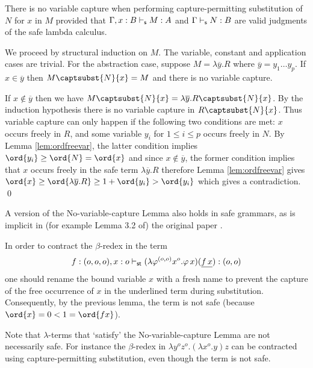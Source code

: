 \begin{lemma}\label{lem:nvc}
\label{lem:homog_nocapture} There is
no variable capture when performing capture-permitting
substitution of $N$ for $x$ in $M$
provided that $\Gamma, x:B \vdash_{\sf s} M : A$ and $\Gamma \vdash_{\sf s}  N : B$ are valid judgments of the safe lambda calculus.
\end{lemma}

\proof
  We proceed by structural induction on $M$. The variable, constant and
  application cases are trivial. For the abstraction case, suppose $M = \lambda \overline{y}. R$ where $\overline{y} = y_1
  \ldots y_p$. If $x \in \overline{y}$ then $M \captsubst{N}{x} = M$ and there is no variable capture.

 If $x \not\in \overline{y}$ then we have $M \captsubst{N}{x} = \lambda \overline{y} . R \captsubst{N}{x}$.  By the induction hypothesis there is no variable capture in $R \captsubst{N}{x}$.  Thus variable capture can only happen if the following two conditions are met: $x$ occurs freely in $R$, and some variable $y_i$ for $1 \leq i \leq p$ occurs freely in $N$. By Lemma \ref{lem:ordfreevar}, the latter condition  implies $\ord{y_i} \geq \ord{N} = \ord{x}$ and  since $x \not \in \overline{y}$, the former condition implies that $x$ occurs freely in the safe term $\lambda \overline{y}. R$
  therefore Lemma \ref{lem:ordfreevar} gives $ \ord{x} \geq
  \ord{\lambda \overline{y} . R} \geq 1+ \ord{y_i} > \ord{y_i}$ which  gives a contradiction.
\qed


\begin{remark}
  A version of the No-variable-capture Lemma also holds in safe
  grammars, as is implicit in (for example Lemma 3.2 of) the original
  paper \cite{KNU02}.
\end{remark}

\begin{example}
  In order to contract the $\beta$-redex in the term
\[f:(o,o,o),x:o
  \vdash_{\sf st} (\lambda \varphi^{(o,o)} x^o . \varphi \, x) (\underline{f \,
    x}) : (o,o)\] one should rename the bound variable $x$ with a fresh name to
  prevent the capture of the free occurrence of $x$ in the underlined term during substitution. Consequently, by the previous lemma,
  the term is not safe (because $\ord{x} = 0 < 1
  = \ord{f x}$).
\end{example}

Note that $\lambda$-terms that `satisfy' the No-variable-capture
Lemma are not necessarily safe. For instance the $\beta$-redex in
$\lambda y^o z^o. (\lambda x^o .y) z$ can be contracted using
capture-permitting substitution, even though the term is not safe.

